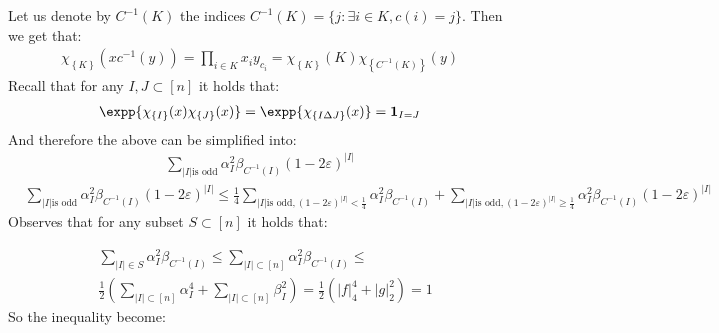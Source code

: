 \documentclass{article}
\newcommand{\Chi}[1]{\chi_{ \left\{ #1  \right\} } }
\begin{document}
Let us denote by $C^{-1}(K)$ the indices $C^{-1}(K) = \{ j : \exists i \in K, c(i) = j \}$. Then we get that:  
\begin{equation*}
  \begin{split}
    \Chi{K}\left( x c^{-1}(y) \right) = \prod_{i \in K}{x_{i}y_{c_{i}}} =  \Chi{K}\left( K \right) \Chi{C^{-1}(K)}\left( y  \right)
  \end{split}
\end{equation*} Recall that for any $I,J \subset [n]$ it holds that: 
\begin{equation*}
  \begin{split}
    \expp{ \Chi{I}(x)\Chi{J}(x) } = \expp{ \Chi{I \Delta J}(x) } = \mathbf{1}_{ I = J }
  \end{split}
\end{equation*}
And therefore the above can be simplified into: 
\begin{equation*}
  \begin{split}
    \sum_{|I| \text{is odd} }{\alpha_{I}^{2}\beta_{C^{-1}(I)}  \left( 1 -2 \varepsilon \right)^{|I|}}   
  \end{split}
\end{equation*}
\begin{equation*}
  \begin{split}
    & \sum_{|I| \text{is odd} }{\alpha_{I}^{2}\beta_{C^{-1}(I)}  \left( 1 -2 \varepsilon \right)^{|I|}}  \le \frac{1}{4} \sum_{|I| \text{is odd}, (1-2\varepsilon)^{|I|} < \frac{1}{4}}{\alpha_{I}^{2}\beta_{C^{-1}(I)}}  + \sum_{|I| \text{is odd}, (1-2\varepsilon)^{|I|} \ge \frac{1}{4} }{\alpha_{I}^{2}\beta_{C^{-1}(I)}  \left( 1 -2 \varepsilon \right)^{|I|}}  
   \end{split}
\end{equation*}
Observes that for any subset $S \subset [n]$ it holds that: 

\begin{equation*}
  \begin{split}
    & \sum_{|I| \in S }{\alpha_{I}^{2}\beta_{C^{-1}(I)}} \le \sum_{|I| \subset [n] }{\alpha_{I}^{2}\beta_{C^{-1}(I)}} \le \\ 
    & \frac{1}{2} \left( \sum_{|I| \subset [n] }{\alpha_{I}^{4}} + \sum_{|I| \subset [n] }{\beta_{I}^{2}}   \right) = \frac{1}{2} \left(|f|_{4}^{4} + |g|_{2}^{2} \right) = 1
  \end{split}
\end{equation*} So the inequality become:  
\end{document}
